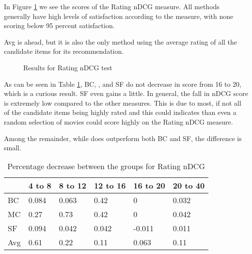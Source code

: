 In Figure \ref{fig:andcg} we see the scores of the Rating nDCG measure. All methods generally have high levels of satisfaction according to the measure, with none scoring below 95 percent satisfaction.

Avg is ahead, but it is also the only method using the average rating of all the candidate items for its recommendation.
\begin{figure}[H]
	\caption{Results for Rating nDCG test}\label{fig:andcg}
\end{figure}

As can be seen in Table \ref{tbl:andcg}, BC, \MC, and SF do not decrease in score from 16 to 20, which is a curious result. SF even gains a little. In general, the fall in nDCG score is extremely low compared to the other measures. This is due to most, if not all of the candidate items being highly rated and this could indicates than even a random selection of movies could score highly on the Rating nDCG measure.

Among the remainder, while \MC does outperform both BC and SF, the difference is small.

\begin{table}[H]
	\centering
	\begin{tabular}{|l|lllll|}\hline
		& 4 to 8 & 8 to 12 & 12 to 16 & 16 to 20 & 20 to 40 \\\hline
		BC 	& 0.084	& 0.063	& 0.42	& 0		& 0.032 \\
		MC  & 0.27	& 0.73	& 0.42	& 0		& 0.042 \\
		SF  & 0.094	& 0.042	& 0.042	&-0.011	& 0.011 \\
		Avg	& 0.61	& 0.22 	& 0.11	& 0.063	& 0.11  \\ \hline
	\end{tabular}
	\caption{Percentage decrease between the groups for Rating nDCG}
	\label{tbl:andcg}
\end{table}

